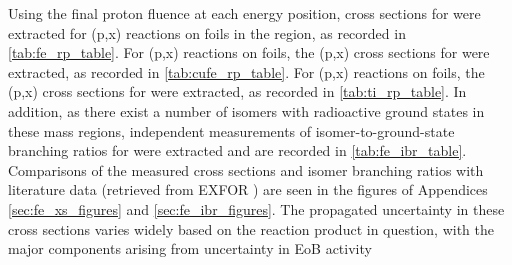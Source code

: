Using the final proton fluence at each energy position, cross sections for   were extracted for (p,x) reactions  on  foils in the  region, as recorded in \autoref{tab:fe_rp_table}.
For  (p,x) reactions on  foils, the (p,x) cross sections for   were extracted, as recorded in \autoref{tab:cufe_rp_table}.
For  (p,x) reactions on  foils, the (p,x) cross sections for   were extracted, as recorded in \autoref{tab:ti_rp_table}.
In addition, as there exist a number of isomers with radioactive ground states in these mass regions,  independent measurements of isomer-to-ground-state branching ratios for  were  extracted and are recorded in \autoref{tab:fe_ibr_table}.
Comparisons  of the measured cross sections and isomer branching ratios with literature data (retrieved from EXFOR \cite{Otuka2014272}) are seen in the figures of Appendices \ref{sec:fe_xs_figures} and \ref{sec:fe_ibr_figures}.
The propagated uncertainty in these cross sections varies widely based on the reaction product in question, with the major components  arising from uncertainty in EoB activity 





